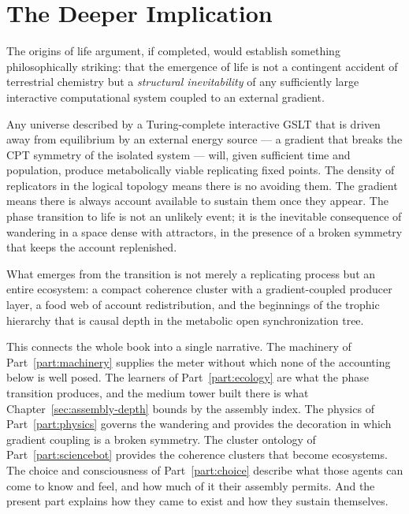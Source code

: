 \section{The Deeper Implication}

The origins of life argument, if completed, would establish
something philosophically striking: that the emergence of life
is not a contingent accident of terrestrial chemistry but a
\emph{structural inevitability} of any sufficiently large
interactive computational system coupled to an external gradient.

Any universe described by a Turing-complete interactive GSLT
that is driven away from equilibrium by an external energy source
--- a gradient that breaks the CPT symmetry of the isolated
system --- will, given sufficient time and population, produce
metabolically viable replicating fixed points.
The density of replicators in the logical topology means there is
no avoiding them.
The gradient means there is always account available to sustain
them once they appear.
The phase transition to life is not an unlikely event; it is
the inevitable consequence of wandering in a space dense with
attractors, in the presence of a broken symmetry that keeps
the account replenished.

What emerges from the transition is not merely a replicating
process but an entire ecosystem: a compact coherence cluster
with a gradient-coupled producer layer, a food web of account
redistribution, and the beginnings of the trophic hierarchy
that is causal depth in the metabolic open synchronization tree.

This connects the whole book into a single narrative.
The machinery of Part~\ref{part:machinery} supplies the meter without
which none of the accounting below is well posed.
The learners of Part~\ref{part:ecology} are what the phase transition
produces, and the medium tower built there is what
Chapter~\ref{sec:assembly-depth} bounds by the assembly index.
The physics of Part~\ref{part:physics} governs the wandering and
provides the decoration in which gradient coupling is a broken symmetry.
The cluster ontology of Part~\ref{part:sciencebot} provides the
coherence clusters that become ecosystems.
The choice and consciousness of Part~\ref{part:choice} describe what
those agents can come to know and feel, and how much of it their
assembly permits.
And the present part explains how they came to exist and how they sustain
themselves.

